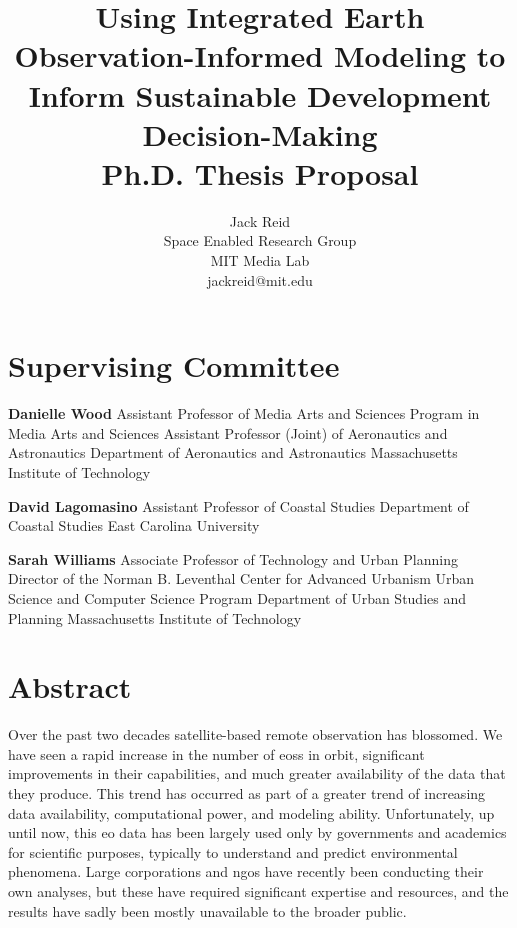 \documentclass[notitlepage]{article}
\newcommand{\compr}{Danielle Wood}
\newcommand{\comte}{David Lagomasino}
\newcommand{\comco}{Sarah Williams}
\newcommand{\comprcredentials}{\newline\indent Assistant Professor of Media Arts and Sciences \newline\indent Program in Media Arts and Sciences \newline\indent Assistant Professor (Joint) of Aeronautics and Astronautics \newline\indent Department of Aeronautics and Astronautics \newline\indent Massachusetts Institute of Technology}
\newcommand{\comtecredentials}{\newline\indent Assistant Professor of Coastal Studies \newline\indent Department of Coastal Studies \newline\indent East Carolina University}
\newcommand{\comcocredentials}{\newline\indent Associate Professor of Technology and Urban Planning \newline\indent  Director of the Norman B. Leventhal Center for Advanced Urbanism \newline\indent Urban Science and Computer Science Program \newline\indent Department of Urban Studies and Planning \newline\indent Massachusetts Institute of Technology}
\begin{document}
\pretitle{\begin{center}\Huge\bfseries}
\posttitle{\par\end{center}\vskip 0.5em}
\preauthor{\begin{center}\Large\ttfamily}
\postauthor{\end{center}}
\predate{\par\large\centering}
\postdate{\par}

\title{Using Integrated Earth Observation-Informed Modeling to Inform Sustainable Development Decision-Making \\  
\large Ph.D. Thesis Proposal} 
\author{%
Jack Reid\\ 
Space Enabled Research Group\\
MIT Media Lab\\
jackreid@mit.edu}

\maketitle

\section*{Supervising Committee}


\vspace{\baselineskip}

\textbf{\compr} \comprcredentials 
 
\vspace{\baselineskip}

\textbf{\comte} \comtecredentials

\vspace{\baselineskip}

\textbf{\comco} \comcocredentials

\thispagestyle{plain}
\pagestyle{plain}

\clearpage

\section*{Abstract}


Over the past two decades satellite-based remote observation has blossomed. We have seen a rapid increase in the number of \acp{eos} in orbit, significant improvements in their capabilities, and much greater availability of the data that they produce. This trend has occurred as part of a greater trend of increasing data availability, computational power, and modeling ability. Unfortunately, up until now, this \ac{eo} data has been largely used only by governments and academics for scientific purposes, typically to understand and predict environmental phenomena. Large corporations and \acp{ngo} have recently been conducting their own analyses, but these have required significant expertise and resources, and the results have sadly been mostly unavailable to the broader public. 
\end{document}
